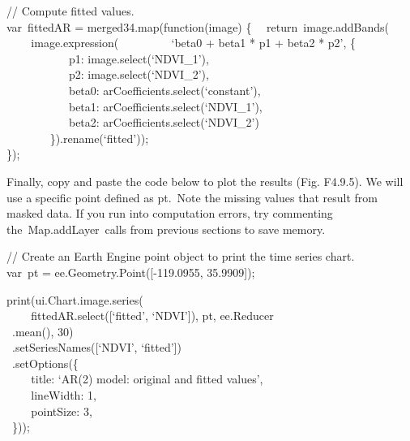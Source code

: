 \documentclass[
  letterpaper,
  DIV=11,
  numbers=noendperiod]{scrreprt}
\begin{document}
// Compute fitted values.\\
var~fittedAR = merged34.map(function(image) \{~
~return~image.addBands(\\
\hspace*{0.333em} ~ ~ ~image.expression(~ ~ ~ ~ ~ ~`beta0 + beta1 * p1 +
beta2 * p2', \{\\
\hspace*{0.333em} ~ ~ ~ ~ ~ ~ ~p1: image.select(`NDVI\_1'),\\
\hspace*{0.333em} ~ ~ ~ ~ ~ ~ ~p2: image.select(`NDVI\_2'),\\
\hspace*{0.333em} ~ ~ ~ ~ ~ ~ ~beta0:
arCoefficients.select(`constant'),\\
\hspace*{0.333em} ~ ~ ~ ~ ~ ~ ~beta1:
arCoefficients.select(`NDVI\_1'),\\
\hspace*{0.333em} ~ ~ ~ ~ ~ ~ ~beta2: arCoefficients.select(`NDVI\_2')\\
\hspace*{0.333em} ~ ~ ~ ~ ~\}).rename(`fitted'));\\
\});

Finally, copy and paste the code below to plot the results (Fig.
F4.9.5). We will use a specific point defined as pt.~Note the missing
values that result from masked data. If you run into computation errors,
try commenting the~Map.addLayer~calls from previous sections to save
memory.

// Create an Earth Engine point object to print the time series chart.\\
var~pt = ee.Geometry.Point({[}-119.0955, 35.9909{]});

print(ui.Chart.image.series(\\
\hspace*{0.333em} ~ ~ ~fittedAR.select({[}`fitted', `NDVI'{]}), pt,
ee.Reducer\\
\hspace*{0.333em} ~.mean(), 30)\\
\hspace*{0.333em} ~.setSeriesNames({[}`NDVI', `fitted'{]})\\
\hspace*{0.333em} ~.setOptions(\{\\
\hspace*{0.333em} ~ ~ ~title: `AR(2) model: original and fitted
values',\\
\hspace*{0.333em} ~ ~ ~lineWidth: 1,\\
\hspace*{0.333em} ~ ~ ~pointSize: 3,\\
\hspace*{0.333em} ~\}));
\end{document}
